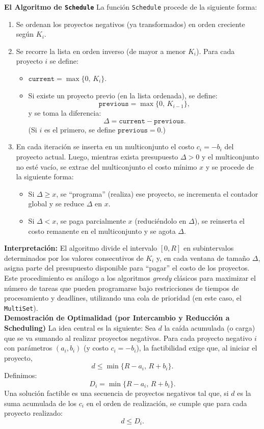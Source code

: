 ﻿\documentclass{article}
\theoremstyle{plain}
\theoremstyle{definition}
\begin{document}
\textbf{El Algoritmo de \texttt{Schedule}}
La función \texttt{Schedule} procede de la siguiente forma:
\begin{enumerate}[label=\arabic*.]
    \item Se ordenan los proyectos negativos (ya transformados) en orden creciente según $K_i$.
    \item Se recorre la lista en orden inverso (de mayor a menor $K_i$). Para cada proyecto $i$ se define:
    \begin{itemize}
        \item $\mathtt{current} = \max\{0,\,K_i\}$.
        \item Si existe un proyecto previo (en la lista ordenada), se define:
        \[
        \mathtt{previous} = \max\{0,\,K_{i-1}\},
        \]
        y se toma la diferencia:
        \[
        \Delta = \mathtt{current} - \mathtt{previous}.
        \]
        (Si $i$ es el primero, se define $\mathtt{previous} = 0$.)
    \end{itemize}
    \item En cada iteración se inserta en un multiconjunto el costo $c_i = -b_i$ del proyecto actual. Luego, mientras exista presupuesto $\Delta > 0$ y el multiconjunto no esté vacío, se extrae del multiconjunto el costo mínimo $x$ y se procede de la siguiente forma:
    \begin{itemize}
        \item Si $\Delta \ge x$, se ``programa'' (realiza) ese proyecto, se incrementa el contador global y se reduce $\Delta$ en $x$.
        \item Si $\Delta < x$, se paga parcialmente $x$ (reduciéndolo en $\Delta$), se reinserta el costo remanente en el multiconjunto y se agota $\Delta$.
    \end{itemize}
\end{enumerate}

\noindent \textbf{Interpretación:} El algoritmo divide el intervalo $[0,R]$ en subintervalos determinados por los valores consecutivos de $K_i$ y, en cada ventana de tamaño $\Delta$, asigna parte del presupuesto disponible para ``pagar'' el costo de los proyectos. Este procedimiento es análogo a los algoritmos \emph{greedy} clásicos para maximizar el número de tareas que pueden programarse bajo restricciones de tiempos de procesamiento y deadlines, utilizando una cola de prioridad (en este caso, el \texttt{MultiSet}).
\\

\textbf{Demostración de Optimalidad (por Intercambio y Reducción a Scheduling)}
La idea central es la siguiente: Sea $d$ la caída acumulada (o carga) que se va sumando al realizar proyectos negativos. Para cada proyecto negativo $i$ con parámetros $(a_i, b_i)$ (y costo $c_i = -b_i$), la factibilidad exige que, al iniciar el proyecto,
\[
d \le \min\{R-a_i,\, R+b_i\}.
\]
Definimos:
\[
D_i = \min\{R-a_i,\, R+b_i\}.
\]
Una solución factible es una secuencia de proyectos negativos tal que, si $d$ es la suma acumulada de los $c_i$ en el orden de realización, se cumple que para cada proyecto realizado:
\[
d \le D_i.
\]
\end{document}
